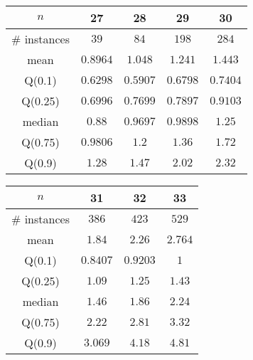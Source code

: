 \begin{tabular}{c|cccc} 
\hline 
$n$ & 27 & 28 & 29 & 30 \tabularnewline 
\hline 
\hline 
\# instances & $39$ & $84$ & $198$ & $284$ \tabularnewline 
mean & $0.8964$ & $1.048$ & $1.241$ & $1.443$ \tabularnewline 
Q(0.1) & $0.6298$ & $0.5907$ & $0.6798$ & $0.7404$ \tabularnewline 
Q(0.25) & $0.6996$ & $0.7699$ & $0.7897$ & $0.9103$ \tabularnewline 
median & $0.88$ & $0.9697$ & $0.9898$ & $1.25$ \tabularnewline 
Q(0.75) & $0.9806$ & $1.2$ & $1.36$ & $1.72$ \tabularnewline 
Q(0.9) & $1.28$ & $1.47$ & $2.02$ & $2.32$ \tabularnewline 
\hline 
\end{tabular} 
\medskip{} 

\begin{tabular}{c|ccc} 
\hline 
$n$ & 31 & 32 & 33 \tabularnewline 
\hline 
\hline 
\# instances & $386$ & $423$ & $529$ \tabularnewline 
mean & $1.84$ & $2.26$ & $2.764$ \tabularnewline 
Q(0.1) & $0.8407$ & $0.9203$ & $1$ \tabularnewline 
Q(0.25) & $1.09$ & $1.25$ & $1.43$ \tabularnewline 
median & $1.46$ & $1.86$ & $2.24$ \tabularnewline 
Q(0.75) & $2.22$ & $2.81$ & $3.32$ \tabularnewline 
Q(0.9) & $3.069$ & $4.18$ & $4.81$ \tabularnewline 
\hline 
\end{tabular} 
\medskip{} 

